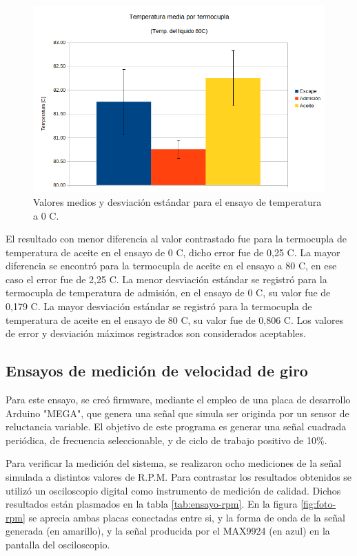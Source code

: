 \begin{figure}[htpb]
\centering
\includegraphics[width=.9\textwidth]{./Figures/temp-80c.png}
\caption{Valores medios y desviación estándar para el ensayo de temperatura a 0 \degree C.}
\label{fig:temp-80c}
\end{figure}

El resultado con menor diferencia al valor contrastado fue para la termocupla de temperatura de aceite en el ensayo de 0 \degree C, dicho error fue de 0,25 \degree C. La mayor diferencia se encontró para la termocupla de aceite en el ensayo a 80 \degree C, en ese caso el error fue de 2,25 \degree C. La menor desviación estándar se registró para la termocupla de temperatura de admisión, en el ensayo de 0 \degree C, su valor fue de 0,179 \degree C. La mayor desviación estándar se registró para la termocupla de temperatura de aceite en el ensayo de 80 \degree C, su valor fue de 0,806 \degree C.  Los valores de error y desviación máximos registrados son considerados aceptables.

\break

\subsection{Ensayos de medición de velocidad de giro}

Para este ensayo, se creó firmware, mediante el empleo de una placa de desarrollo Arduino "MEGA", que genera una señal que simula ser originda por un sensor de reluctancia variable. El objetivo de este programa es generar una señal cuadrada periódica, de frecuencia seleccionable, y de ciclo de trabajo positivo de 10\%.

Para verificar la medición del sistema, se realizaron ocho mediciones de la señal simulada a distintos valores de R.P.M. Para contrastar los resultados obtenidos se utilizó un osciloscopio digital como instrumento de medición de calidad. Dichos resultados están plasmados en la tabla \ref{tab:ensayo-rpm}. En la figura \ref{fig:foto-rpm} se aprecia ambas placas conectadas entre si, y la forma de onda de la señal generada (en amarillo), y la señal producida por el MAX9924 (en azul) en la pantalla del osciloscopio.

